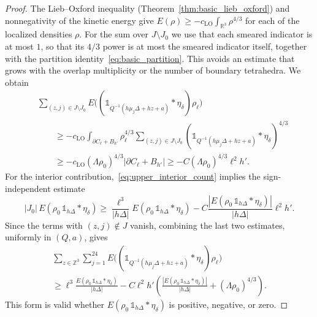 \documentclass[final,reqno]{amsart}
\theoremstyle{remark}
\theoremstyle{definition}
\renewcommand{\ge}{\geqslant}
\newcommand{\RR}{\mathbb{R}}
\newcommand{\ZZ}{\mathbb{Z}}
\newcommand{\iden}{\mathbb{1}}
\newcommand{\tetra}{\mathbb{\Delta}}
\begin{document}
\begin{proof}
The Lieb--Oxford inequality (Theorem~\ref{thm:basic_lieb_oxford}) and nonnegativity of the kinetic energy give $E(\rho)\ge-c_{\mathrm{LO}}\int_{\RR^3}\rho^{4/3}$ for each of the localized densities $\rho$. For the sum over $J\setminus J_0$ we use that each smeared indicator is at most $1$, so that its $4/3$ power is at most the smeared indicator itself, together with the partition identity~\eqref{eq:basic_partition}. This avoids an estimate that grows with the overlap multiplicity or the number of boundary tetrahedra. We obtain
\begin{align*}
&\sum_{(z,j)\in J\setminus J_0}E\big((\iden_{Q^{-1}(h\mu_j\tetra+h z+a)}*\eta_\delta)\rho_\ell\big)\\
&\qquad\ge-c_{\mathrm{LO}}\int_{\partial C_\ell+B_{h'}}\rho_\ell^{4/3}
\sum_{(z,j)\in J\setminus J_0}(\iden_{Q^{-1}(h\mu_j\tetra+h z+a)}*\eta_\delta)^{4/3}\\
&\qquad\ge-c_{\mathrm{LO}}(\Lambda\rho_0)^{4/3}|\partial C_\ell+B_{h'}|
\ge-C(\Lambda\rho_0)^{4/3}\ell^2h'.
\end{align*}
For the interior contribution,~\eqref{eq:upper_interior_count} implies the sign-independent estimate
\[
|J_0|\,E(\rho_0\,\iden_{h\tetra}*\eta_\delta)
\ge\frac{\ell^3}{|h\tetra|}E(\rho_0\,\iden_{h\tetra}*\eta_\delta)
-C\frac{|E(\rho_0\,\iden_{h\tetra}*\eta_\delta)|}{|h\tetra|}\ell^2h'.
\]
Since the terms with $(z,j)\notin J$ vanish, combining the last two estimates, uniformly in $(Q,a)$, gives
\begin{multline}\label{eq:upper_local_sum_bound}
\sum_{z\in\ZZ^3}\sum_{j=1}^{24}E\big((\iden_{Q^{-1}(h\mu_j\tetra+h z+a)}*\eta_\delta)\rho_\ell\big)
\\
\ge \ell^3\frac{E(\rho_0\,\iden_{h\tetra}*\eta_\delta)}{|h\tetra|}
-C \ell^2h'\left(\frac{|E(\rho_0\,\iden_{h\tetra}*\eta_\delta)|}{|h\tetra|}+(\Lambda\rho_0)^{4/3}\right).
\end{multline}
This form is valid whether $E(\rho_0\,\iden_{h\tetra}*\eta_\delta)$ is positive, negative, or zero.


\end{proof}
\end{document}
